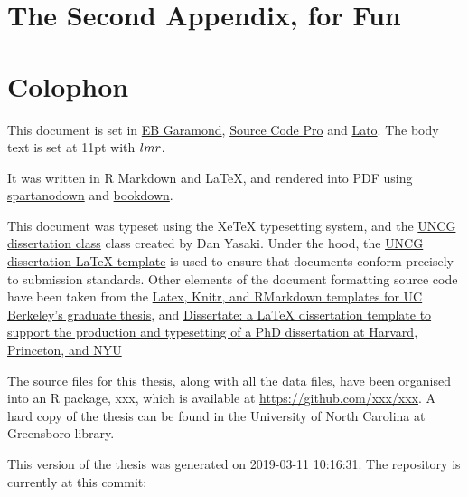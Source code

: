 \documentclass[ms]{uncgdissertationexp}
\theoremstyle{plain}
\theoremstyle{definition}
\theoremstyle{remark}
\begin{document}
  \chapter{The Second Appendix, for
  Fun}\label{the-second-appendix-for-fun}
  
  \chapter*{Colophon}\label{colophon}
  
  This document is set in \href{https://github.com/georgd/EB-Garamond}{EB
  Garamond}, \href{https://github.com/adobe-fonts/source-code-pro/}{Source
  Code Pro} and \href{http://www.latofonts.com/lato-free-fonts/}{Lato}.
  The body text is set at 11pt with \(\familydefault\).
  
  It was written in R Markdown and LaTeX, and rendered into PDF using
  \href{https://github.com/ashley-williams/spartanodown}{spartanodown} and
  \href{https://github.com/rstudio/bookdown}{bookdown}.
  
  This document was typeset using the XeTeX typesetting system, and the
  \href{https://mathstats.uncg.edu/wp-content/uploads/2018/08/uncgdissertationexp.cls}{UNCG
  dissertation class} class created by Dan Yasaki. Under the hood, the
  \href{https://mathstats.uncg.edu/wp-content/uploads/2018/08/sample.tex}{UNCG
  dissertation LaTeX template} is used to ensure that documents conform
  precisely to submission standards. Other elements of the document
  formatting source code have been taken from the
  \href{https://github.com/stevenpollack/ucbthesis}{Latex, Knitr, and
  RMarkdown templates for UC Berkeley's graduate thesis}, and
  \href{https://github.com/suchow/Dissertate}{Dissertate: a LaTeX
  dissertation template to support the production and typesetting of a PhD
  dissertation at Harvard, Princeton, and NYU}
  
  The source files for this thesis, along with all the data files, have
  been organised into an R package, xxx, which is available at
  \url{https://github.com/xxx/xxx}. A hard copy of the thesis can be found
  in the University of North Carolina at Greensboro library.
  
  This version of the thesis was generated on 2019-03-11 10:16:31. The
  repository is currently at this commit:
  
\end{document}
